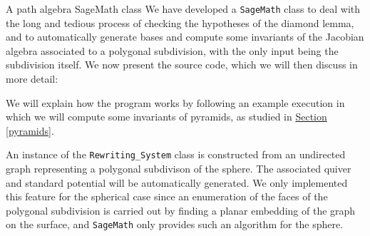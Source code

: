 \begin{chapter}{A path algebra SageMath class}
\label{appendix}
We have developed a \texttt{SageMath} class to deal with the long and tedious process of checking the hypotheses of the diamond lemma, and to automatically generate bases and compute some invariants of the Jacobian algebra associated to a polygonal subdivision, with the only input being the subdivision itself. We now present the source code, which we will then discuss in more detail:

We will explain how the program works by following an example execution in which we will compute some invariants of pyramids, as studied in \hyperref[pyramids]{Section \ref*{pyramids}}.

An instance of the \texttt{Rewriting\_System} class is constructed from an undirected graph representing a polygonal subdivison of the sphere. The associated quiver and standard potential will be automatically generated. We only implemented this feature for the spherical case since an enumeration of the faces of the polygonal subdivision is carried out by finding a planar embedding of the graph on the surface, and \texttt{SageMath} only provides such an algorithm for the sphere.


\end{chapter}

